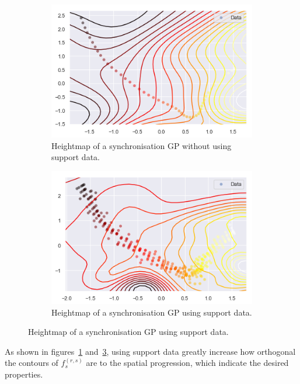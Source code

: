 \begin{figure}[H]
		\caption{Support data comparison}
  \begin{subfigure}[b]{0.5\textwidth}
    \includegraphics[width=\textwidth]{figures/heat-without-support-data.png}
    \caption{Heightmap of a synchronisation GP without using support data.}
    \label{fig:heightmap-without-support}
  \end{subfigure}
  \begin{subfigure}[b]{0.5\textwidth}
    \includegraphics[width=\textwidth]{figures/heat-with-support-data.png}
    \caption{Heightmap of a synchronisation GP using support data.}
    \label{fig:heightmap-with-support}
  \end{subfigure}
\end{figure}
\noindent
As shown in figures~\ref{fig:heightmap-without-support} and~\ref{fig:heightmap-with-support}, using support data greatly increase how orthogonal the contours of $f^{(r,s)}_s$ are to the spatial progression, which indicate the desired properties.

